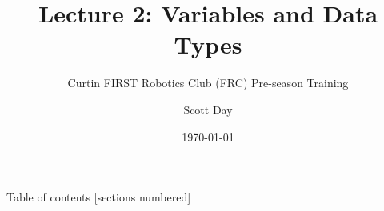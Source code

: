 \documentclass[9pt]{beamer}              %
\title{Lecture 2: Variables and Data Types}
\subtitle{Curtin FIRST Robotics Club (FRC) Pre-season Training}
\date{\today}
\author{Scott Day}
\institute{Curtin University}
\begin{document}


\maketitle

\begin{frame}{Table of contents}
  [sections numbered]
  \tableofcontents[hideallsubsections]
\end{frame}







\end{document}
